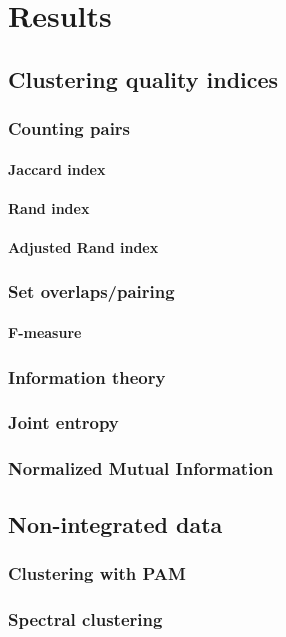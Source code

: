 \chapter{Results}
\section{Clustering quality indices}
\subsection{Counting pairs}
\subsubsection{Jaccard index}
\subsubsection{Rand index}
\subsubsection{Adjusted Rand index}
\subsection{Set overlaps/pairing}
\subsubsection{F-measure}
\subsection{Information theory}
\subsection{Joint entropy}
\subsection{Normalized Mutual Information}
\section{Non-integrated data}
\subsection{Clustering with PAM}
\subsection{Spectral clustering}
